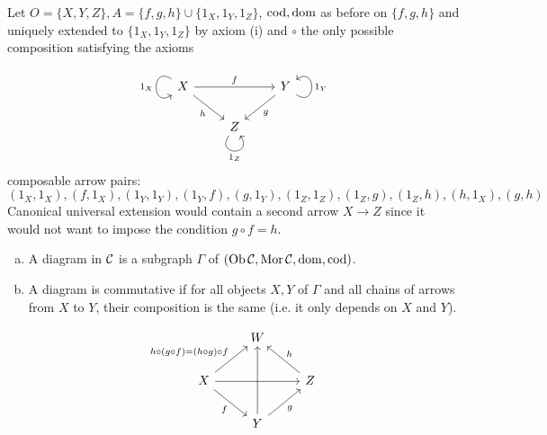 \documentclass[a4paper]{report}
\begin{document}
\begin{rem}
  Let $O = \{X, Y, Z\}, A = \{f, g, h\} \cup \{1_{X}, 1_{Y}, 1_{Z}\}$, $\operatorname{cod}, \operatorname{dom}$ as before on $\{f, g, h\}$ and uniquely extended to $\{1_{X}, 1_{Y}, 1_{Z}\}$ by axiom (i) and $\circ$ the only possible composition satisfying the axioms
  \[\begin{tikzcd}
X \arrow["1_X"', loop, distance=2em, in=215, out=145] \arrow[rr, "f"] \arrow[rd, "h"'] &                                                       & Y \arrow["1_Y"', loop, distance=2em, in=35, out=325] \arrow[ld, "g"] \\
                                                                                      & Z \arrow["1_Z"', loop, distance=2em, in=305, out=235] &
\end{tikzcd}\]
  composable arrow pairs:
  \[(1_{X}, 1_{X}), (f, 1_{X}), (1_{Y}, 1_{Y}), (1_{Y}, f), (g, 1_{Y}), (1_{Z}, 1_{Z}), (1_{Z}, g) , (1_{Z}, h), (h, 1_{X}), (g,h)\]
  Canonical universal extension would contain a second arrow $X \to Z$ since it would not want to impose the condition $g \circ f = h$.
\end{rem}
\begin{defi}
\begin{enumerate}[(a)]
  \item A diagram in $\mathcal{C}$ is a subgraph $\Gamma$ of $(\operatorname{Ob} \mathcal{C}, \operatorname{Mor} \mathcal{C}, \operatorname{dom}, \operatorname{cod})$.
        \item A diagram is commutative if for all objects $X, Y$ of $\Gamma$ and all chains of arrows from $X$ to $Y$, their composition is the same (i.e. it only depends on $X$ and $Y$).
\end{enumerate}
\end{defi}
\begin{exmp*}
\[\begin{tikzcd}[row sep = 20]
                                                                                                    & W                                         &                   \\
X \arrow[rd, "f"'] \arrow[rr, ""] \arrow[ru, "h \circ (g \circ f) = (h \circ g) \circ f"] &                                           & Z \arrow[lu, "h"'] \\
                                                                                                    & Y \arrow[ru, "g"'] \arrow[uu, ""] &
\end{tikzcd}\]
\end{exmp*}
\end{document}
